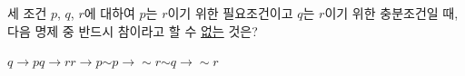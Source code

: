 세 조건 $p$, $q$, $r$에 대하여 $p$는 $r$이기 위한 필요조건이고 $q$는 $r$이기 위한 충분조건일 때, 다음 명제 중 반드시 참이라고 할 수 \underline{없는} 것은?
\begin{choices32}{$q\longrightarrow p$}{$q\longrightarrow r$}{$r\longrightarrow p$}{${\sim}p\longrightarrow {\sim}r$}{${\sim}q\longrightarrow {\sim}r$}\end{choices32}
